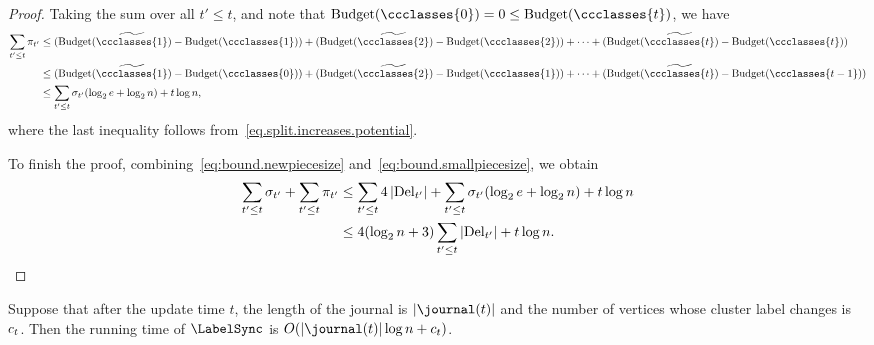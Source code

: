 \begin{proof}
    Taking the sum over all $ t'\leq t $, and note that $ \potential{\ccclasses{0}} = 0 \leq \potential{\ccclasses{t}} $, we have
    { \small
    \begin{align}
        \sum_{t'\leq t} \smallpiecesize{t'} &\leq (\potential{\widetilde{\ccclasses{1}}} - \potential{\ccclasses{1}}) + (\potential{\widetilde{\ccclasses{2}}} - \potential{\ccclasses{2}}) + \dots + (\potential{\widetilde{\ccclasses{t}}} - \potential{\ccclasses{t}}) \nonumber \\
                                            &\leq (\potential{\widetilde{\ccclasses{1}}} - \potential{\ccclasses{0}}) + (\potential{\widetilde{\ccclasses{2}}} - \potential{\ccclasses{1}}) + \dots + (\potential{\widetilde{\ccclasses{t}}} - \potential{\ccclasses{t-1}}) \nonumber \\
                                            &\leq \sum_{t'\leq t} \newpiecesize{t'}(\log_{2}e + \log_{2}n) + t\log n, \label{eq:bound.smallpiecesize}
    \end{align} 
    }
    where the last inequality follows from~\eqref{eq.split.increases.potential}.

    To finish the proof, combining~\eqref{eq:bound.newpiecesize} and~\eqref{eq:bound.smallpiecesize}, we obtain
    \begin{align}
        \sum_{t'\leq t} \sigma_{t'} + \sum_{t'\leq t}\pi_{t'} &\leq \sum_{t'\leq t} 4\left\lvert \mathrm{Del}_{t'} \right \rvert + \sum_{t'\leq t} \sigma_{t'}(\log_{2}e + \log_{2}n) + t\log n \nonumber \\
                                                                                  &\leq 4(\log_{2}n + 3)\sum_{t'\leq t}\left\lvert \mathrm{Del}_{t'} \right \rvert + t\log n. \nonumber
    \end{align}
\end{proof}

\begin{lemma}\label{lem:labelsync.cost}
    Suppose that after the update time $ t $, the length of the journal is $ \jnTime{t} $ and the number of vertices whose cluster label changes is $ c_{t} $. 
    Then the running time of $ \LabelSync $ is $ O(\jnTime{t}\log n + \nChangedVers{t}) $.
\end{lemma}

